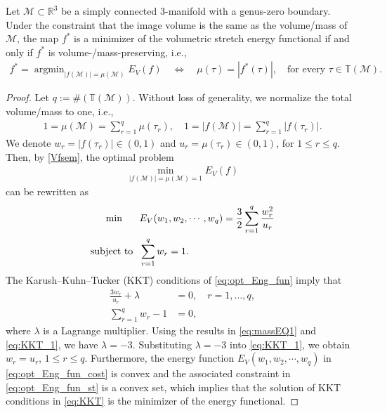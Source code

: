 \documentclass[onefignum,onetabnum]{siamonline220329}
\numberwithin{equation}{section}
\def\M{\mathcal{M}}
\DeclareMathOperator*{\argmin}{argmin}
\begin{document}
\begin{sloppypar}
\begin{theorem} \label{thm:f_argmin}
Let $\mathcal{M}\subset\mathbb{R}^3$ be a simply connected 3-manifold with a genus-zero boundary. 
Under the constraint that the image volume is the same as the volume/mass of $\M$, the map $f^*$ is a minimizer of the volumetric stretch energy functional if and only if $f^*$ is volume-/mass-preserving, i.e.,
\begin{align}
f^*=\mathop{\argmin}_{|f(\M)|=\mu(\M)}E_V(f)\quad \Longleftrightarrow\quad \mu(\tau)=|f^*(\tau)|, \quad\text{for every $\tau\in\mathbb{T}(\mathcal{M})$}. \label{eq:equ_cond}
\end{align}
\end{theorem}
\begin{proof}
Let $q:=\#\left(\mathbb{T}(\mathcal{M})\right)$. 
Without loss of generality, we normalize the total volume/mass to one, i.e.,  
\begin{align}
1=\mu(\mathcal{M})=\sum_{r=1}^q\mu(\tau_r),\quad 1=|f(\mathcal{M})|=\sum_{r=1}^q|f(\tau_r)|. \label{eq:massEQ1}
\end{align}
We denote ${w}_r=|f(\tau_r)|\in(0,1)$ and ${u}_r=\mu(\tau_r)\in(0,1)$, for $1\leq r\leq q$.
Then, by \eqref{Vfsem}, the optimal problem 
\begin{align*}
    \min_{|f(\M)|=\mu(\M) = 1}  E_V(f)  
\end{align*}
can be rewritten as
\begin{subequations} \label{eq:opt_Eng_fun}
\begin{align}
    \min \hspace{5mm} & \ E_V({w}_1, {w}_2,\cdots, {w}_q) = \frac{3}{2}\sum_{r=1}^q\frac{{w}_r^2}{{u}_r} \label{eq:opt_Eng_fun_cost} \\
    \mbox{subject to } & \ \sum_{r=1}^q{w}_r=1. \label{eq:opt_Eng_fun_st}
\end{align}
\end{subequations}
The Karush--Kuhn--Tucker (KKT) conditions of \eqref{eq:opt_Eng_fun} imply that
\begin{subequations} \label{eq:KKT}
\begin{align}
    \frac{3w_r}{u_r} + \lambda &= 0, \quad r = 1, \ldots, q, \label{eq:KKT_1}\\
    \sum_{r=1}^q w_r - 1 &= 0,
\end{align}
\end{subequations}
where $\lambda$ is a Lagrange multiplier.
Using the results in \eqref{eq:massEQ1} and \eqref{eq:KKT_1}, we have $\lambda = -3$.
Substituting $\lambda=-3$ into \eqref{eq:KKT_1}, we obtain ${w}_r={u}_r$, $1\leq r\leq q$. Furthermore, the energy function $E_V({w}_1, {w}_2,\cdots, {w}_q)$ in \eqref{eq:opt_Eng_fun_cost} is convex and the associated constraint in \eqref{eq:opt_Eng_fun_st} is a convex set, which implies that the solution of KKT conditions in \eqref{eq:KKT} is the minimizer of the energy functional.
\end{proof}


\end{sloppypar}
\end{document}
